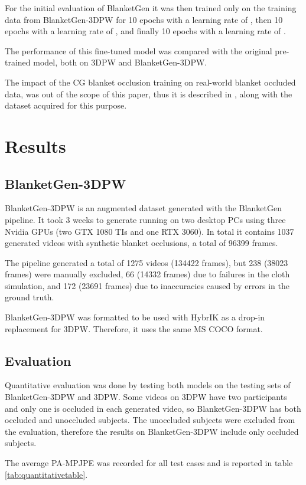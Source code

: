 \documentclass[conference]{IEEEtran}
\begin{document}
For the initial evaluation of BlanketGen it was then trained only on the training data from BlanketGen-3DPW for 10 epochs with a learning rate of , then 10 epochs with a learning rate of , and finally 10 epochs with a learning rate of .

The performance of this fine-tuned model was compared with the original pre-trained model, both on 3DPW and BlanketGen-3DPW.

The impact of the CG blanket occlusion training on real-world blanket occluded data, was out of the scope of this paper, thus it is described in \cite{blanketset}, along with the dataset acquired for this purpose.



\section{Results}
\subsection{BlanketGen-3DPW}
BlanketGen-3DPW is an augmented dataset generated with the BlanketGen pipeline. It took 3 weeks to generate running on two desktop PCs using three Nvidia GPUs (two GTX 1080 TIs and one RTX 3060). In total it contains 1037 generated videos with synthetic blanket occlusions, a total of 96399 frames.

The pipeline generated a total of 1275 videos (134422 frames), but 238 (38023 frames) were manually excluded, 66 (14332 frames) due to failures in the cloth simulation, and 172 (23691 frames) due to inaccuracies caused by errors in the ground truth.

BlanketGen-3DPW was formatted to be used with HybrIK as a drop-in replacement for 3DPW. Therefore, it uses the same MS COCO format. 

\subsection{Evaluation}
Quantitative evaluation was done by testing both models on the testing sets of BlanketGen-3DPW and 3DPW. Some videos on 3DPW have two participants and only one is occluded in each generated video, so BlanketGen-3DPW has both occluded and unoccluded subjects. The unoccluded subjects were excluded from the evaluation, therefore the results on BlanketGen-3DPW include only occluded subjects.

The average PA-MPJPE was recorded for all test cases and is reported in table \ref{tab:quantitativetable}.
\end{document}
